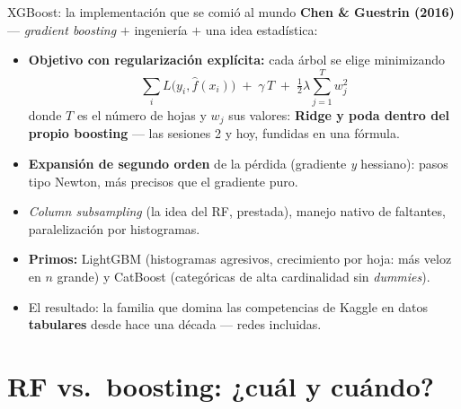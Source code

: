 \documentclass{beamer}
\newcommand{\1}{\mathbb{I}}
\begin{document}
\begin{frame}{XGBoost: la implementación que se comió al mundo}
\small
\textbf{Chen \& Guestrin (2016)} --- \emph{gradient boosting} $+$ ingeniería $+$ una idea estadística:
\pause
\begin{itemize}\itemsep5pt
  \item \textbf{Objetivo con regularización explícita:} cada árbol se elige minimizando
  \[ \sum_i L\big(y_i, \hat{f}(x_i)\big) \;+\; \gamma\, T \;+\; \tfrac{1}{2}\lambda \sum_{j=1}^{T} w_j^2 \]
  donde $T$ es el número de hojas y $w_j$ sus valores: \textbf{Ridge y poda dentro del propio boosting} --- las sesiones 2 y hoy, fundidas en una fórmula. \pause
  \item \textbf{Expansión de segundo orden} de la pérdida (gradiente \emph{y} hessiano): pasos tipo Newton, más precisos que el gradiente puro. \pause
  \item \emph{Column subsampling} (la idea del RF, prestada), manejo nativo de faltantes, paralelización por histogramas. \pause
\end{itemize}

\vspace{0.1cm}
\begin{itemize}\itemsep3pt
  \item \textbf{Primos:} LightGBM (histogramas agresivos, crecimiento por hoja: más veloz en $n$ grande) y CatBoost (categóricas de alta cardinalidad sin \emph{dummies}).
  \item El resultado: la familia que domina las competencias de Kaggle en datos \textbf{tabulares} desde hace una década --- redes incluidas.
\end{itemize}
\end{frame}


\section{RF vs.\ boosting: ¿cuál y cuándo?}
\begin{frame}[noframenumbering]
\tableofcontents[currentsection]
\end{frame}
\end{document}
